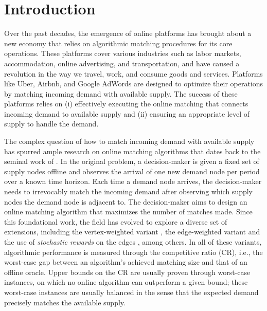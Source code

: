 \section{Introduction}
\label{sec: introduction}

Over the past decades, the emergence of online platforms has brought about a new economy that relies on algorithmic matching procedures for its core operations. These platforms cover various industries such as labor markets, accommodation, online advertising, and transportation, and have caused a revolution in the way we travel, work, and consume goods and services. Platforms like Uber, Airbnb, and Google AdWords are designed to optimize their operations by matching incoming demand with available supply. 
The success of these platforms relies on (i) effectively executing the online matching that connects incoming demand to available supply and (ii) ensuring an appropriate level of supply to handle the demand. 

The complex question of how to match incoming demand with available supply has spurred ample research on online matching algorithms that dates back to the seminal work of \citet{karp1990optimal}. 
In the original problem, a decision-maker is given a fixed set of supply nodes offline and observes the arrival of one new demand node per period over a known time horizon. 
Each time a demand node arrives, the decision-maker needs to irrevocably match the incoming demand after observing which supply nodes the demand node is adjacent to. The decision-maker aims to design an online matching algorithm that maximizes the number of matches made. Since this foundational work, the field has evolved to explore a diverse set of extensions, including the vertex-weighted variant \citep{aggarwal2011online,jaillet2014online}, the edge-weighted variant \citep{feldman2009free,haeupler2011online} and the use of \textit{stochastic rewards} on the edges \citep{mehta2012online,mehta2014online}, among others. In all of these variants, algorithmic performance is measured through the competitive ratio (CR), i.e., the worst-case gap between an algorithm's achieved matching size and that of an offline oracle. Upper bounds on the CR are usually proven through worst-case instances, on which no online algorithm can outperform a given bound; these worst-case instances are usually balanced in the sense that the expected demand precisely matches the available supply.



